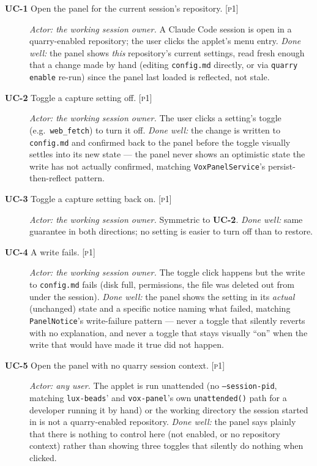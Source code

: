 \documentclass[a4paper,11pt]{report}
\newcommand{\uc}[1]{\textbf{UC-#1}}
\newcommand{\pone}{\textsc{[p1]}}
\begin{document}
\begin{description}

\item[\uc{1} Open the panel for the current session's repository. \pone{}]
  \emph{Actor: the working session owner.} A Claude Code session is open
  in a quarry-enabled repository; the user clicks the applet's menu
  entry. \emph{Done well:} the panel shows \emph{this} repository's
  current settings, read fresh enough that a change made by hand
  (editing \texttt{config.md} directly, or via \texttt{quarry enable}
  re-run) since the panel last loaded is reflected, not stale.

\item[\uc{2} Toggle a capture setting off. \pone{}] \emph{Actor: the
  working session owner.} The user clicks a setting's toggle (e.g.\
  \texttt{web\_fetch}) to turn it off. \emph{Done well:} the change is
  written to \texttt{config.md} and confirmed back to the panel before
  the toggle visually settles into its new state --- the panel never
  shows an optimistic state the write has not actually confirmed,
  matching \texttt{VoxPanelService}'s persist-then-reflect pattern.

\item[\uc{3} Toggle a capture setting back on. \pone{}] \emph{Actor: the
  working session owner.} Symmetric to \uc{2}. \emph{Done well:} same
  guarantee in both directions; no setting is easier to turn off than to
  restore.

\item[\uc{4} A write fails. \pone{}] \emph{Actor: the working session
  owner.} The toggle click happens but the write to \texttt{config.md}
  fails (disk full, permissions, the file was deleted out from under the
  session). \emph{Done well:} the panel shows the setting in its
  \emph{actual} (unchanged) state and a specific notice naming what
  failed, matching \texttt{PanelNotice}'s write-failure pattern --- never
  a toggle that silently reverts with no explanation, and never a toggle
  that stays visually ``on'' when the write that would have made it true
  did not happen.

\item[\uc{5} Open the panel with no quarry session context. \pone{}]
  \emph{Actor: any user.} The applet is run unattended (no
  \texttt{--session-pid}, matching \texttt{lux-beads}' and
  \texttt{vox-panel}'s own \texttt{unattended()} path for a developer
  running it by hand) or the working directory the session started in is
  not a quarry-enabled repository. \emph{Done well:} the panel says
  plainly that there is nothing to control here (not enabled, or no
  repository context) rather than showing three toggles that silently do
  nothing when clicked.


\end{description}
\end{document}
